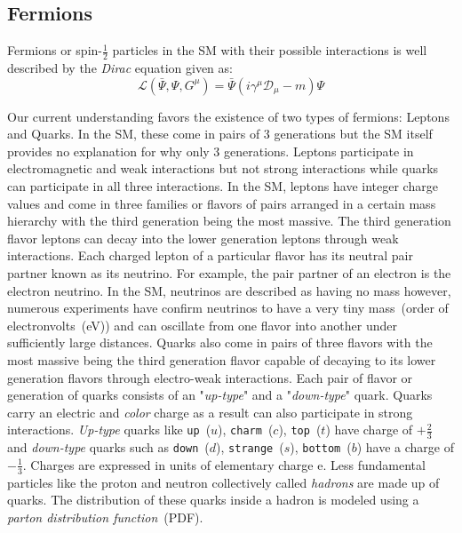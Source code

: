 \subsection*{Fermions}
Fermions or spin-$\frac{1}{2}$ particles in the SM with their possible interactions is well described by the \textit{Dirac} equation given as:
\begin{equation}
\mathcal{L}(\bar{\Psi},\Psi, G^{\mu}) = \bar{\Psi}\left(i \gamma^{\mu}\mathcal{D}_{\mu} - m \right)\Psi 
\end{equation}

Our current understanding favors the existence of two types of fermions: Leptons and Quarks. In the SM, these come in pairs of 3 generations but the SM itself provides no explanation for why only 3 generations.
Leptons participate in electromagnetic and weak interactions but not strong interactions while quarks can participate in all three interactions. In the SM, leptons have integer charge values and come in three families or flavors of pairs arranged in a certain mass hierarchy with the third generation being the most massive. The third generation flavor leptons can decay into the lower generation leptons through weak interactions. Each charged lepton of a particular flavor has its neutral pair partner known as its neutrino. For example, the pair partner of an electron is the electron neutrino. In the SM, neutrinos are described as having no mass however, numerous experiments have confirm neutrinos to have a very tiny mass~(order of electronvolts~(eV)) and can oscillate from one flavor into another under sufficiently large distances.
\newline
Quarks also come in pairs of three flavors with the most massive being the third generation flavor capable of decaying to its lower generation flavors through electro-weak interactions. Each pair of flavor or generation of quarks consists of an "\textit{up-type}" and a "\textit{down-type}" quark. Quarks carry an electric and \textit{color} charge as a result can also participate in strong interactions. \textit{Up-type} quarks like \texttt{up}~($u$), \texttt{charm}~($c$), \texttt{top}~($t$) have charge of $+\frac{2}{3}$ and \textit{down-type} quarks such as \texttt{down}~($d$), \texttt{strange}~($s$), \texttt{bottom}~($b$) have a charge of $-\frac{1}{3}$. Charges are expressed in units of elementary charge e.
Less fundamental particles like the proton  and neutron collectively called \textit{hadrons} are made up of quarks. The distribution of these quarks inside a hadron is modeled using a \textit{parton distribution function}~(PDF). 

